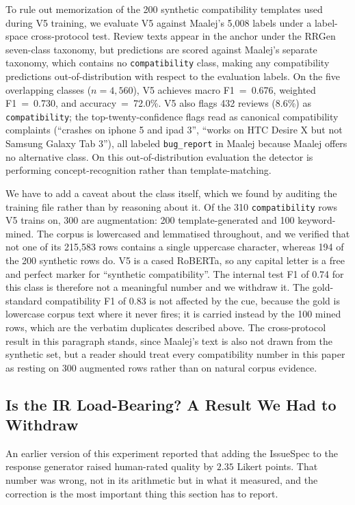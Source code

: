 \documentclass[preprint,12pt]{elsarticle}
\begin{document}
To rule out memorization of the 200 synthetic compatibility templates used during V5 training, we evaluate V5 against Maalej's 5{,}008 labels under a label-space cross-protocol test. Review texts appear in the anchor under the RRGen seven-class taxonomy, but predictions are scored against Maalej's separate taxonomy, which contains no \texttt{compatibility} class, making any compatibility predictions out-of-distribution with respect to the evaluation labels. On the five overlapping classes ($n=4{,}560$), V5 achieves macro F1~=~0.676, weighted F1~=~0.730, and accuracy~=~72.0\%. V5 also flags 432 reviews (8.6\%) as \texttt{compatibility}; the top-twenty-confidence flags read as canonical compatibility complaints (``crashes on iphone 5 and ipad 3'', ``works on HTC Desire X but not Samsung Galaxy Tab 3''), all labeled \texttt{bug\_report} in Maalej because Maalej offers no alternative class. On this
out-of-distribution evaluation the detector is performing concept-recognition rather than
template-matching.

We have to add a caveat about the class itself, which we found by auditing the training file
rather than by reasoning about it. Of the 310 \texttt{compatibility} rows V5 trains on, 300 are
augmentation: 200 template-generated and 100 keyword-mined. The corpus is lowercased and
lemmatised throughout, and we verified that not one of its 215{,}583 rows contains a single
uppercase character, whereas 194 of the 200 synthetic rows do. V5 is a cased RoBERTa, so any
capital letter is a free and perfect marker for ``synthetic compatibility''. The internal test
F1 of 0.74 for this class is therefore not a meaningful number and we withdraw it. The
gold-standard compatibility F1 of 0.83 is not affected by the cue, because the gold is lowercase
corpus text where it never fires; it is carried instead by the 100 mined rows, which are the
verbatim duplicates described above. The cross-protocol result in this paragraph stands, since
Maalej's text is also not drawn from the synthetic set, but a reader should treat every
compatibility number in this paper as resting on 300 augmented rows rather than on natural
corpus evidence.

\subsection{Is the IR Load-Bearing? A Result We Had to Withdraw}\label{exp2-results}

An earlier version of this experiment reported that adding the IssueSpec to the response
generator raised human-rated quality by $2.35$ Likert points. That number was wrong, not in its
arithmetic but in what it measured, and the correction is the most important thing this section
has to report.
\end{document}
